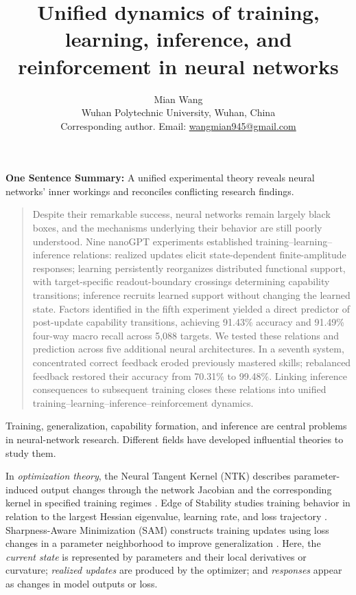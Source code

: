 \documentclass[12pt,letterpaper]{article}
\date{}
\title{\bfseries Unified dynamics of training, learning, inference, and reinforcement in neural networks}
\author{Mian Wang\\
{\small Wuhan Polytechnic University, Wuhan, China}\\
{\small Corresponding author. Email: \href{mailto:wangmian945@gmail.com}{wangmian945@gmail.com}}}
\makeatletter
\renewcommand{\maketitle}{\begin{center}\vspace*{-1em}{\Large\bfseries\@title\par}\vspace{1em}{\normalsize\@author\par}\end{center}\vspace{.5em}}
\renewenvironment{abstract}{\begin{quotation}\normalfont}{\end{quotation}}
\makeatother
\begin{document}
\maketitle
\begin{center}
{\small\textbf{One Sentence Summary:} A unified experimental theory reveals neural networks' inner workings and reconciles conflicting research findings.}
\end{center}
\begin{abstract}
Despite their remarkable success, neural networks remain largely black boxes, and the mechanisms underlying their behavior are still poorly understood. Nine nanoGPT experiments established training--learning--inference relations: realized updates elicit state-dependent finite-amplitude responses; learning persistently reorganizes distributed functional support, with target-specific readout-boundary crossings determining capability transitions; inference recruits learned support without changing the learned state. Factors identified in the fifth experiment yielded a direct predictor of post-update capability transitions, achieving 91.43\% accuracy and 91.49\% four-way macro recall across 5,088 targets. We tested these relations and prediction across five additional neural architectures. In a seventh system, concentrated correct feedback eroded previously mastered skills; rebalanced feedback restored their accuracy from 70.31\% to 99.48\%. Linking inference consequences to subsequent training closes these relations into unified training--learning--inference--reinforcement dynamics.
\end{abstract}

\noindent
Training, generalization, capability formation, and inference are central problems in neural-network research. Different fields have developed influential theories to study them.

In \emph{optimization theory}, the Neural Tangent Kernel (NTK) describes parameter-induced output changes through the network Jacobian and the corresponding kernel in specified training regimes \cite{jacot2018}. Edge of Stability studies training behavior in relation to the largest Hessian eigenvalue, learning rate, and loss trajectory \cite{cohen2021}. Sharpness-Aware Minimization (SAM) constructs training updates using loss changes in a parameter neighborhood to improve generalization \cite{foret2021}. Here, the \emph{current state} is represented by parameters and their local derivatives or curvature; \emph{realized updates} are produced by the optimizer; and \emph{responses} appear as changes in model outputs or loss.
\end{document}
